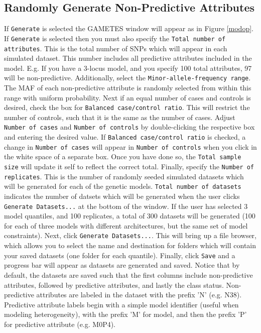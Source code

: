 \documentclass{report}
\begin{document}
\subsection{Randomly Generate Non-Predictive Attributes}
If \texttt{Generate} is selected the GAMETES window will appear as in Figure \ref{modop}.  If \texttt{Generate} is selected then you must also specify the \texttt{Total number of} \texttt{attributes}.  This is the total number of SNPs which will appear in each simulated dataset.  This number includes all predictive attributes included in the model.  E.g.  If you have a 3-locus model, and you specify 100 total attributes, 97 will be non-predictive.  Additionally, select the \texttt{Minor-allele-frequency range}.  The MAF of each non-predictive attribute is randomly selected from within this range with uniform probability.  Next if an equal number of cases and controls is desired, check the box for \texttt{Balanced case/control ratio}.  This will restrict the number of controls, such that it is the same as the number of cases.  Adjust \texttt{Number of cases} and \texttt{Number of controls} by double-clicking the respective box and entering the desired value.  If \texttt{Balanced case/control ratio} is checked, a change in \texttt{Number of cases} will appear in \texttt{Number of controls} when you click in the white space of a separate box.  Once you have done so, the \texttt{Total sample size} will update it self to reflect the correct total. Finally, specify the \texttt{Number of replicates}.  This is the number of randomly seeded simulated datasets which will be generated for each of the genetic models.  \texttt{Total number of datasets} indicates the number of datsets which will be generated when the user clicks \texttt{Generate Datasets...} at the bottom of the window.  If the user has selected 3 model quantiles, and 100 replicates, a total of 300 datasets will be generated (100 for each of three models with different architectures, but the same set of model constraints).  Next, click \texttt{Generate Datasets...}.  This will bring up a file browser, which allows you to select the name and destination for folders which will contain your saved datasets (one folder for each quantile).  Finally, click \texttt{Save} and a progress bar will appear as datasets are generated and saved.  Notice that by default, the datasets are saved such that the first columns include non-predictive attributes, followed by predictive attributes, and lastly the class status.  Non-predictive attributes are labeled in the dataset with the prefix 'N' (e.g. N38).  Predictive attribute labels begin with a simple model identifier (useful when modeling heterogeneity), with the prefix 'M' for model, and then the prefix 'P' for predictive attribute (e.g. M0P4).
\end{document}
